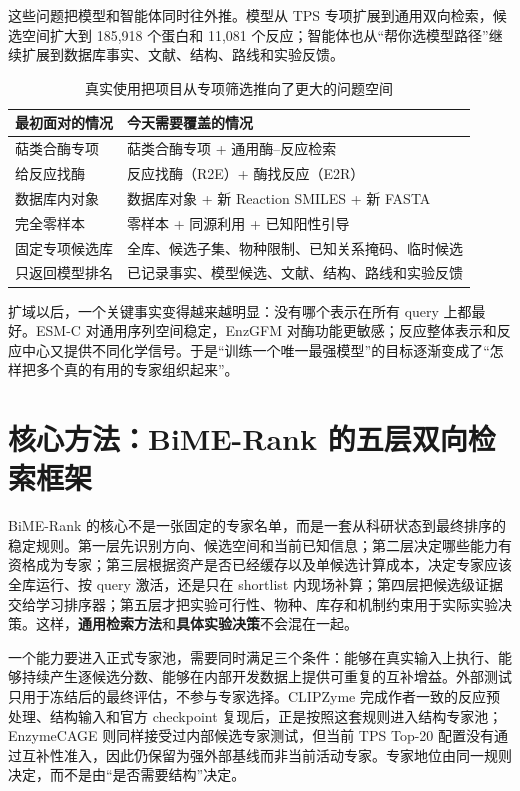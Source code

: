 \documentclass[11pt,a4paper]{ctexart}
\begin{document}
这些问题把模型和智能体同时往外推。模型从 TPS 专项扩展到通用双向检索，候选空间扩大到 185,918 个蛋白和 11,081 个反应；智能体也从“帮你选模型路径”继续扩展到数据库事实、文献、结构、路线和实验反馈。

\begin{table}[htbp]
\centering
\caption{真实使用把项目从专项筛选推向了更大的问题空间}
\begin{tabularx}{\textwidth}{@{}L{38mm}Y@{}}
\toprule
\textbf{最初面对的情况} & \textbf{今天需要覆盖的情况}\\
\midrule
萜类合酶专项 & 萜类合酶专项 + 通用酶--反应检索\\
给反应找酶 & 反应找酶（R2E）+ 酶找反应（E2R）\\
数据库内对象 & 数据库对象 + 新 Reaction SMILES + 新 FASTA\\
完全零样本 & 零样本 + 同源利用 + 已知阳性引导\\
固定专项候选库 & 全库、候选子集、物种限制、已知关系掩码、临时候选\\
只返回模型排名 & 已记录事实、模型候选、文献、结构、路线和实验反馈\\
\bottomrule
\end{tabularx}
\end{table}

扩域以后，一个关键事实变得越来越明显：没有哪个表示在所有 query 上都最好。ESM-C 对通用序列空间稳定，EnzGFM 对酶功能更敏感；反应整体表示和反应中心又提供不同化学信号。于是“训练一个唯一最强模型”的目标逐渐变成了“怎样把多个真的有用的专家组织起来”。

\section{核心方法：BiME-Rank 的五层双向检索框架}

BiME-Rank 的核心不是一张固定的专家名单，而是一套从科研状态到最终排序的稳定规则。第一层先识别方向、候选空间和当前已知信息；第二层决定哪些能力有资格成为专家；第三层根据资产是否已经缓存以及单候选计算成本，决定专家应该全库运行、按 query 激活，还是只在 shortlist 内现场补算；第四层把候选级证据交给学习排序器；第五层才把实验可行性、物种、库存和机制约束用于实际实验决策。这样，\textbf{通用检索方法}和\textbf{具体实验决策}不会混在一起。

一个能力要进入正式专家池，需要同时满足三个条件：能够在真实输入上执行、能够持续产生逐候选分数、能够在内部开发数据上提供可重复的互补增益。外部测试只用于冻结后的最终评估，不参与专家选择。CLIPZyme\cite{clipzyme2024} 完成作者一致的反应预处理、结构输入和官方 checkpoint 复现后，正是按照这套规则进入结构专家池；EnzymeCAGE 则同样接受过内部候选专家测试，但当前 TPS Top-20 配置没有通过互补性准入，因此仍保留为强外部基线而非当前活动专家。专家地位由同一规则决定，而不是由“是否需要结构”决定。
\end{document}
